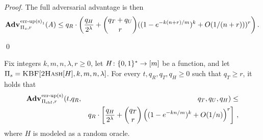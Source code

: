 \begin{proof}
The full adversarial advantage is then
$$\Adv{\erreps_1}_{\struct_s,r}(\advA) \le q_R \cdot \left(\frac{q_H}{2^\lambda} + \binom{q_T+q_U}{r}((1-e^{-k(n+r)/m})^k+O(1/(n+r)))^r\right).$$

\hfill\qed
\end{proof}

\begin{theorem}\label{thm:bf-key-bound}
Fix integers $k, m, n, \lambda, r\geq 0$, let $H \colon \{0,1\}^* \to [m]$ be a function, and let $\mathrm{\Pi}_s = \textsc{KBF}[\textsc{2Hash}[H],k,m,n,\lambda]$.
  For every $t, q_R, q_T, q_H \geq 0$ such that $q_T \geq r$, it holds that
  \begin{eqnarray*}
    \Adv{\erreps}_{\struct_\saltybloom,r}(t,&q_R,& q_T, q_U, q_H) \leq \\ && q_R \cdot
     \left[
      \frac{q_H}{2^\lambda} +
      {\dbinom{q_T}{r}} \left( (1-e^{-kn/m})^k + O(1/n) \right)^r
    \right] \,,
\end{eqnarray*}
where $H$ is modeled as a random oracle.
\end{theorem}

